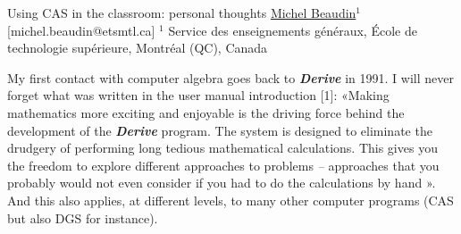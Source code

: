 


\begin{abstract_online}{Using CAS in the classroom: personal thoughts}{%
        \underline{Michel Beaudin}$^{1}$}{[michel.beaudin@etsmtl.ca]
        }{%
        $^1$ Service des enseignements généraux, École de technologie supérieure, Montréal (QC), Canada \newline}
    
My first contact with computer algebra goes back to \textbf{\emph{Derive}} in 1991. I will never forget what was written in the user manual introduction [1]: «Making mathematics more exciting and enjoyable is the driving force behind the development of the \textbf{\emph{Derive}} program.  The system is designed to eliminate the drudgery of performing long tedious mathematical calculations.  This gives you the freedom to explore different approaches to problems  \emph{--} approaches that you probably would not even consider if you had to do the calculations by hand ».  And this also applies, at different levels, to many other computer programs (CAS but also DGS for instance).
 

\end{abstract_online}
